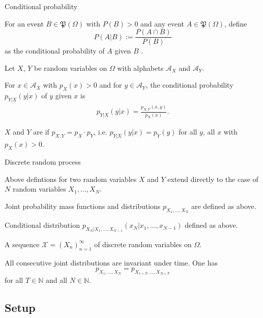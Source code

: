 \begin{frame}{Conditional probability} 
\bit
\item For an event $B\in\mathfrak{P}(\Omega)$ with $P(B)>0$ and any event $A\in\mathfrak{P}(\Omega)$, define 
\[
P(A|B):=\frac{P(A\cap B)}{P(B)}
\]
as the conditional probability of $A$ given $B$ .
\eit
{}
\bit
\item  Let $X$, $Y$ be random variables on $\Omega$ with alphabets $\mathcal{A}_X$ and $\mathcal{A}_Y$. 
\item For $x\in\mathcal{A}_X$ with $p_X(x)>0$ and for $y\in\mathcal{A}_Y$, the conditional probability $p_{Y|X}(y|x)$ of $y$ given $x$ is 
\begin{align*}
p_{Y|X}(y|x)=\frac{p_{X,Y}(x,y)}{p_X(x)}.
\end{align*}
\item $X$ and $Y$ are  if $p_{X,Y}=p_X\cdot p_Y$, i.e. $p_{Y|X}(y|x)=p_Y(y)$ for all $y$, all $x$ with $p_X(x)>0$.
\eit
\end{frame}


\begin{frame}{Discrete random process} 
\bit
\item Above defintions for two random variables $X$ and $Y$ extend directly to the case of $N$ random variables $X_1,\dots,X_N$. 
\item Joint probability mass functions and distributions $p_{X_1,\dots,X_N}$ are defined as above.
\item Conditional distribution $p_{X_N|X_1,\dots,X_{N-1}}(x_N|x_1,\dots,x_{N-1})$ defined as above. 
\eit
{}
\bit
\item A sequence $\mathcal{X}=(X_n)_{n=1}^\infty$ of discrete random variables on $\Omega$.
\eit
{}
\bit
\item All consecutive joint distributions are invariant under time. One has
\[
p_{X_1,\dots,X_N}=p_{X_{1+T},\dots,X_{N+T}}
\]
for all $T\in\mathbb{N}$ and all $N\in\mathbb{N}$. 
\eit
\end{frame}


\subsection{Setup}


